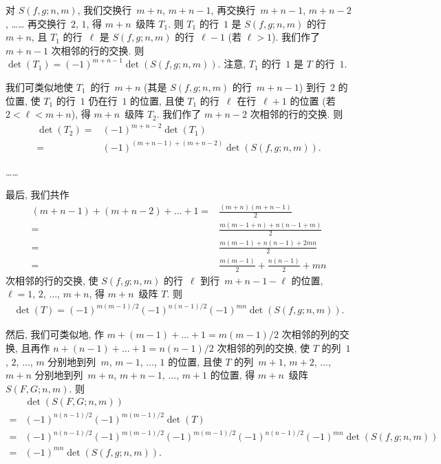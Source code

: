 \documentclass[../libro.tex]{subfiles}
\begin{document}
\begin{example}
    对 \(S(f, g; n, m)\),
    我们交换行~\(m+n\), \(m+n-1\),
    再交换行~\(m+n-1\), \(m+n-2\),
    ……
    再交换行~\(2\), \(1\),
    得 \(m+n\)~级阵 \(T_1\).
    则 \(T_1\) 的行~\(1\) 是 \(S(f, g; n, m)\) 的行~\(m+n\),
    且 \(T_1\) 的行~\(\ell\) 是 \(S(f, g; n, m)\) 的行~\(\ell-1\)
    (若 \(\ell > 1\)).
    我们作了 \(m+n-1\) 次相邻的行的交换.
    则 \(\det {(T_1)} = (-1)^{m+n-1} \det {(S(f, g; n, m))}\).
    注意, \(T_1\) 的行~\(1\) 是 \(T\) 的行~\(1\).

    我们可类似地使 \(T_1\)~的行~\(m+n\)
    (其是 \(S(f, g; n, m)\) 的行~\(m+n-1\))
    到行~\(2\) 的位置,
    使 \(T_1\) 的行~\(1\) 仍在行~\(1\) 的位置,
    且使 \(T_1\) 的行~\(\ell\) 在行~\(\ell+1\) 的位置
    (若 \(2 < \ell < m+n\)),
    得 \(m+n\)~级阵 \(T_2\).
    我们作了 \(m+n-2\) 次相邻的行的交换.
    则
    \begin{align*}
        \det {(T_2)}
        = {} & (-1)^{m+n-2} \det {(T_1)}                      \\
        = {} & (-1)^{(m+n-1)+(m+n-2)} \det {(S(f, g; n, m))}.
    \end{align*}

    ……

    最后, 我们共作
    \begin{align*}
        (m+n-1) + (m+n-2) + \dots + 1
        = {} &
        \frac{(m+n)(m+n-1)}{2}
        \\
        = {} &
        \frac{m (m-1+n) + n (n-1+m)}{2}
        \\
        = {} &
        \frac{m(m-1) + n(n-1) + 2mn}{2}
        \\
        = {} &
        \frac{m(m-1)}{2} + \frac{n(n-1)}{2} + mn
    \end{align*}
    次相邻的行的交换,
    使 \(S(f, g; n, m)\) 的行~\(\ell\)
    到行~\(m+n-1-\ell\) 的位置,
    \(\ell = 1\), \(2\), \(\dots\), \(m+n\),
    得 \(m+n\)~级阵 \(T\).
    则
    \begin{align*}
        \det {(T)}
        = (-1)^{m(m-1)/2} (-1)^{n(n-1)/2} (-1)^{mn}
        \det {(S(f, g; n, m))}.
    \end{align*}

    然后, 我们可类似地,
    作 \(m + (m-1) + \dots + 1 = m(m-1)/2\)
    次相邻的列的交换,
    且再作 \(n + (n-1) + \dots + 1 = n(n-1)/2\)
    次相邻的列的交换,
    使 \(T\) 的列~\(1\), \(2\), \(\dots\), \(m\)
    分别地到列~\(m\), \(m-1\), \(\dots\), \(1\) 的位置,
    且使 \(T\) 的列~\(m+1\), \(m+2\), \(\dots\), \(m+n\)
    分别地到列~\(m+n\), \(m+n-1\), \(\dots\), \(m+1\) 的位置,
    得 \(m+n\)~级阵 \(S(F, G; n, m)\).
    则
    \begin{align*}
        &
        \det {(S(F, G; n, m))}
        \\
        = {} &
        (-1)^{n(n-1)/2} (-1)^{m(m-1)/2} \det {(T)}
        \\
        = {} &
        (-1)^{n(n-1)/2} (-1)^{m(m-1)/2}
        (-1)^{m(m-1)/2} (-1)^{n(n-1)/2} (-1)^{mn}
        \det {(S(f, g; n, m))}
        \\
        = {} &
        (-1)^{mn} \det {(S(f, g; n, m))}.
    \end{align*}


\end{example}
\end{document}
